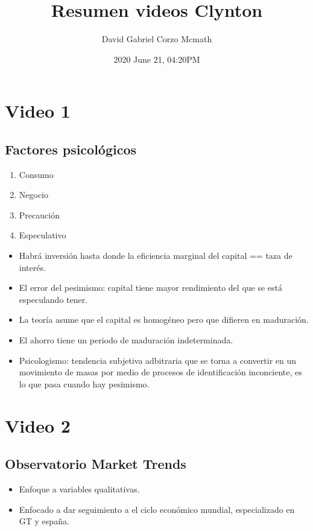 \documentclass{article}
\title{Resumen videos Clynton}
\date{2020 June 21, 04:20PM}
\author{David Gabriel Corzo Mcmath}
\begin{document}
\maketitle
\section{Video 1}
\subsection{Factores psicológicos}
\begin{enumerate}
    \item Consumo
    \item Negocio 
    \item Precaución
    \item Especulativo
\end{enumerate}
\hlinefill

\begin{itemize}
    \item Habrá inversión hasta donde la eficiencia marginal del capital == taza de interés.
    \item El error del pesimismo: capital tiene mayor rendimiento del que se está especulando tener. 
    \item La teoría asume que el capital es homogéneo pero que difieren en maduración. 
    \item El ahorro tiene un periodo de maduración indeterminada. 
    \item Psicologismo: tendencia subjetiva adbitraria que se torna a convertir en un movimiento de masas por medio de procesos de identificación inconciente, es lo que pasa cuando hay pesimismo.
\end{itemize}

\section{Video 2}
\subsection{Observatorio Market Trends}
\begin{itemize}
    \item Enfoque a variables qualitativas.
    \item Enfocado a dar seguimiento a el ciclo económico mundial, especializado en GT y españa. 
\end{itemize}
\end{document}
